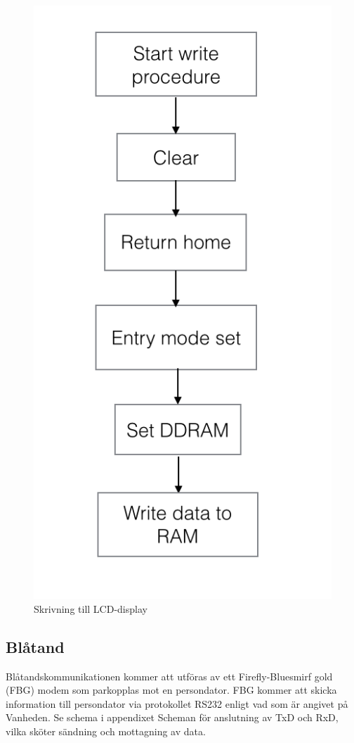 \documentclass[a4paper,12pt,fleqn]{article}
\begin{document}
\begin{figure}[htp] %
  \begin{center}
  \includegraphics[keepaspectratio=true,scale=0.4]{write}  %
  \end{center}
  \caption{Skrivning till LCD-display} %
  \label{fig:flowlcdwrite}
\end{figure}

\subsection{Blåtand}
Blåtandskommunikationen kommer att utföras av ett Firefly-Bluesmirf gold (FBG) modem som parkopplas mot en persondator.
FBG kommer att skicka information till persondator via protokollet RS232 enligt vad som är angivet på Vanheden. 
Se schema i appendixet Scheman för anslutning av TxD och RxD, vilka sköter sändning och mottagning av data.
\end{document}
